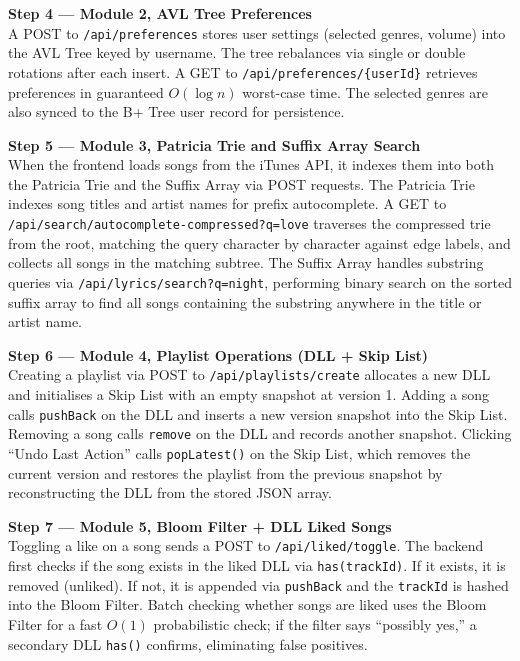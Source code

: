 \documentclass[12pt, a4paper]{article}
\begin{document}
\textbf{Step 4 --- Module 2, AVL Tree Preferences}\\
A POST to \texttt{/api/preferences} stores user settings (selected genres, volume) into the AVL Tree keyed by username. The tree rebalances via single or double rotations after each insert. A GET to \texttt{/api/preferences/\{userId\}} retrieves preferences in guaranteed $O(\log n)$ worst-case time. The selected genres are also synced to the B+ Tree user record for persistence.

\textbf{Step 5 --- Module 3, Patricia Trie and Suffix Array Search}\\
When the frontend loads songs from the iTunes API, it indexes them into both the Patricia Trie and the Suffix Array via POST requests. The Patricia Trie indexes song titles and artist names for prefix autocomplete. A GET to \texttt{/api/search/autocomplete-compressed?q=love} traverses the compressed trie from the root, matching the query character by character against edge labels, and collects all songs in the matching subtree. The Suffix Array handles substring queries via \texttt{/api/lyrics/search?q=night}, performing binary search on the sorted suffix array to find all songs containing the substring anywhere in the title or artist name.

\textbf{Step 6 --- Module 4, Playlist Operations (DLL + Skip List)}\\
Creating a playlist via POST to \texttt{/api/playlists/create} allocates a new DLL and initialises a Skip List with an empty snapshot at version 1. Adding a song calls \texttt{pushBack} on the DLL and inserts a new version snapshot into the Skip List. Removing a song calls \texttt{remove} on the DLL and records another snapshot. Clicking ``Undo Last Action'' calls \texttt{popLatest()} on the Skip List, which removes the current version and restores the playlist from the previous snapshot by reconstructing the DLL from the stored JSON array.

\textbf{Step 7 --- Module 5, Bloom Filter + DLL Liked Songs}\\
Toggling a like on a song sends a POST to \texttt{/api/liked/toggle}. The backend first checks if the song exists in the liked DLL via \texttt{has(trackId)}. If it exists, it is removed (unliked). If not, it is appended via \texttt{pushBack} and the \texttt{trackId} is hashed into the Bloom Filter. Batch checking whether songs are liked uses the Bloom Filter for a fast $O(1)$ probabilistic check; if the filter says ``possibly yes,'' a secondary DLL \texttt{has()} confirms, eliminating false positives.
\end{document}
